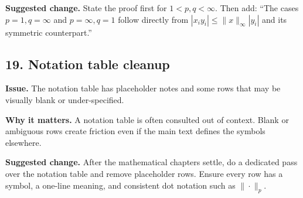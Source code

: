 \documentclass[11pt]{article}
\begin{document}
\textbf{Suggested change.}  State the proof first for \(1<p,q<\infty\).  Then add: ``The cases \(p=1,q=\infty\) and \(p=\infty,q=1\) follow directly from \(|x_i y_i|\le \|x\|_\infty |y_i|\) and its symmetric counterpart.''

\subsection*{19. Notation table cleanup}

\textbf{Issue.}  The notation table has placeholder notes and some rows that may be visually blank or under-specified.

\textbf{Why it matters.}  A notation table is often consulted out of context.  Blank or ambiguous rows create friction even if the main text defines the symbols elsewhere.

\textbf{Suggested change.}  After the mathematical chapters settle, do a dedicated pass over the notation table and remove placeholder rows.  Ensure every row has a symbol, a one-line meaning, and consistent dot notation such as \(\|\cdot\|_p\).
\end{document}

